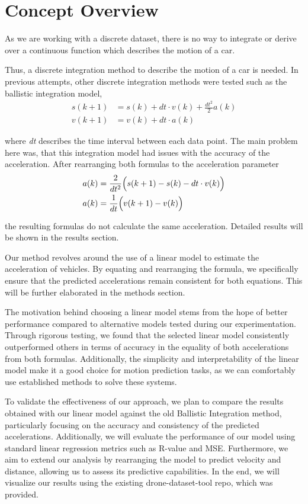 \section{Concept Overview}
As we are working with a discrete dataset, there is no way to integrate or derive over a continuous function 
which describes the motion of a car. 

Thus, a discrete integration method to describe the motion of a car is needed. 
In previous attempts, other discrete integration methods were tested such as the ballistic integration model, 
\begin{align}
s(k+1) &= s(k) + dt \cdot v(k) + \frac{dt^2}{2} a(k) \\
v(k+1) &= v(k) + dt \cdot                       a(k)
\end{align}

where \textit{dt} describes the time interval between each data point.
The main problem here was, that this integration model had issues with the accuracy of the acceleration. 
After rearranging both formulas to the acceleration parameter 
\begin{align}
    a(k) &= \frac{2}{dt^2} \Bigl( s(k+1) - s(k) - dt \cdot v(k) \Bigr)\\
    a(k) &= \frac{1}{dt} \Bigl( v(k+1) - v(k) \Bigr)
\end{align}

the resulting formulas do not calculate the same acceleration. 
Detailed results will be shown in the results section.

Our method revolves around the use of a linear model to estimate the acceleration of vehicles.
By equating and rearranging the formula, we specifically ensure that the predicted accelerations remain consistent
for both equations.
This will be further elaborated in the methods section.

The motivation behind choosing a linear model stems from the hope of better performance compared 
to alternative models tested during our experimentation. 
Through rigorous testing, we found that the selected linear model consistently outperformed others in 
terms of accuracy in the equality of both accelerations from both formulas.
Additionally, the simplicity and interpretability of the linear model make it a good choice for 
motion prediction tasks, as we can comfortably use established methods to solve these systems. 

To validate the effectiveness of our approach, we plan to compare the results obtained with our linear 
model against the old Ballistic Integration method, particularly focusing on the accuracy and consistency of 
the predicted accelerations. 
Additionally, we will evaluate the performance of our model using standard linear regression metrics such as 
R-value and MSE. 
Furthermore, we aim to extend our analysis by rearranging the model to predict velocity and distance, 
allowing us to assess its predictive capabilities.
In the end, we will visualize our results using the existing drone-dataset-tool repo, 
which was provided.


